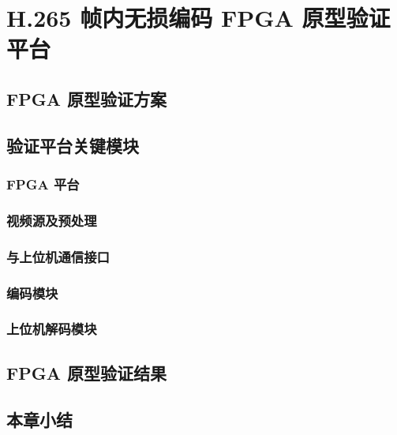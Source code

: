 \chapter{H.265 帧内无损编码 FPGA 原型验证平台}
\label{cha:c5}

\section{FPGA 原型验证方案}

\section{验证平台关键模块}
\subsection{FPGA 平台}

\subsection{视频源及预处理}

\subsection{与上位机通信接口}

\subsection{编码模块}

\subsection{上位机解码模块}

\section{FPGA 原型验证结果}

\section{本章小结}